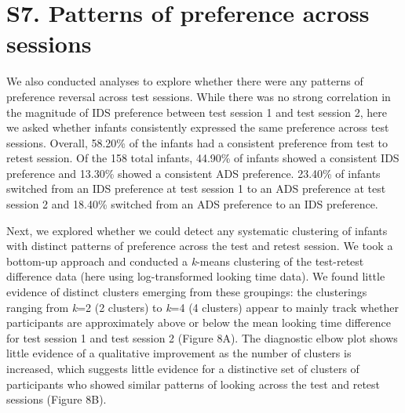 \documentclass[
  man, donotrepeattitle,floatsintext]{apa6}
\begin{document}
\newpage

\hypertarget{s7.-patterns-of-preference-across-sessions}{%
\section{S7. Patterns of preference across sessions}\label{s7.-patterns-of-preference-across-sessions}}

We also conducted analyses to explore whether there were any patterns of preference reversal across test sessions.
While there was no strong correlation in the magnitude of IDS preference between test session 1 and test session 2, here we asked whether infants consistently expressed the same preference across test sessions.
Overall, 58.20\% of the infants had a consistent preference from test to retest session.
Of the 158 total infants, 44.90\% of infants showed a consistent IDS preference and 13.30\% showed a consistent ADS preference.
23.40\% of infants switched from an IDS preference at test session 1 to an ADS preference at test session 2 and 18.40\% switched from an ADS preference to an IDS preference.

Next, we explored whether we could detect any systematic clustering of infants with distinct patterns of preference across the test and retest session.
We took a bottom-up approach and conducted a \emph{k}-means clustering of the test-retest difference data (here using log-transformed looking time data).
We found little evidence of distinct clusters emerging from these groupings: the clusterings ranging from \emph{k}=2 (2 clusters) to \emph{k}=4 (4 clusters) appear to mainly track whether participants are approximately above or below the mean looking time difference for test session 1 and test session 2 (Figure 8A).
The diagnostic elbow plot shows little evidence of a qualitative improvement as the number of clusters is increased, which suggests little evidence for a distinctive set of clusters of participants who showed similar patterns of looking across the test and retest sessions (Figure 8B).
\end{document}
